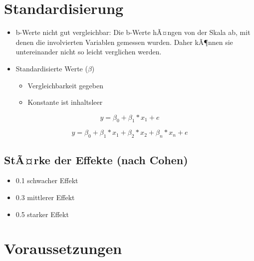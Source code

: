 \documentclass[
]{book}
\providecommand{\tightlist}{%
  \setlength{\itemsep}{0pt}\setlength{\parskip}{0pt}}
\begin{document}
\hypertarget{standardisierung}{%
\section{Standardisierung}\label{standardisierung}}

\begin{itemize}
\tightlist
\item
  b-Werte nicht gut vergleichbar: Die b-Werte hÃ¤ngen von der Skala ab, mit denen die involvierten Variablen gemessen wurden. Daher kÃ¶nnen sie untereinander nicht so leicht verglichen werden.
\item
  Standardisierte Werte (\(\beta\))

  \begin{itemize}
  \tightlist
  \item
    Vergleichbarkeit gegeben
  \item
    Konstante ist inhaltsleer
  \end{itemize}
\end{itemize}

\[ y = \beta_{0} + \beta_{1}*x_{1} + e \]

\[ y = \beta_{0} + \beta_{1}*x_{1} + \beta_{2}*x_{2} + \beta_{n}*x_{n} + e \]

\hypertarget{stuxe3rke-der-effekte-nach-cohen}{%
\subsection{StÃ¤rke der Effekte (nach Cohen)}\label{stuxe3rke-der-effekte-nach-cohen}}

\begin{itemize}
\tightlist
\item
  0.1 schwacher Effekt
\item
  0.3 mittlerer Effekt
\item
  0.5 starker Effekt
\end{itemize}

\hypertarget{voraussetzungen-2}{%
\section{Voraussetzungen}\label{voraussetzungen-2}}
\end{document}
